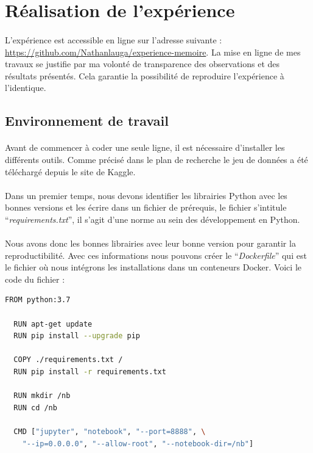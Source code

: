 \documentclass[10pt, french, a4paper]{report}
\begin{document}
\section{Réalisation de l'expérience}

\paragraph{}
L'expérience est accessible en ligne sur l'adresse suivante : \href{https://github.com/Nathanlauga/experience-memoire}{https://github.com/Nathanlauga/experience-memoire}. La mise en ligne de mes travaux se justifie par ma volonté de transparence des observations et des résultats présentés. Cela garantie la possibilité de reproduire l'expérience à l'identique. 

\subsection{Environnement de travail}

\paragraph{}
Avant de commencer à coder une seule ligne, il est nécessaire d'installer les différents outils. Comme précisé dans le plan de recherche le jeu de données a été téléchargé depuis le site de Kaggle.

\paragraph{}
Dans un premier temps, nous devons identifier les librairies Python avec les bonnes versions et les écrire dans un fichier de prérequis, le fichier s'intitule ``\textit{requirements.txt}'', il s'agit d'une norme au sein des développement en Python. 

\paragraph{}
Nous avons donc les bonnes librairies avec leur bonne version pour garantir la reproductibilité. Avec ces informations nous pouvons créer le ``\textit{Dockerfile}'' qui est le fichier où nous intégrons les installations dans un conteneurs Docker. Voici le code du fichier : 

\begin{lstlisting}[language=bash]
  FROM python:3.7

  RUN apt-get update 
  RUN pip install --upgrade pip
  
  COPY ./requirements.txt /
  RUN pip install -r requirements.txt
  
  RUN mkdir /nb
  RUN cd /nb
  
  CMD ["jupyter", "notebook", "--port=8888", \ 
    "--ip=0.0.0.0", "--allow-root", "--notebook-dir=/nb"]
\end{lstlisting}
\end{document}
